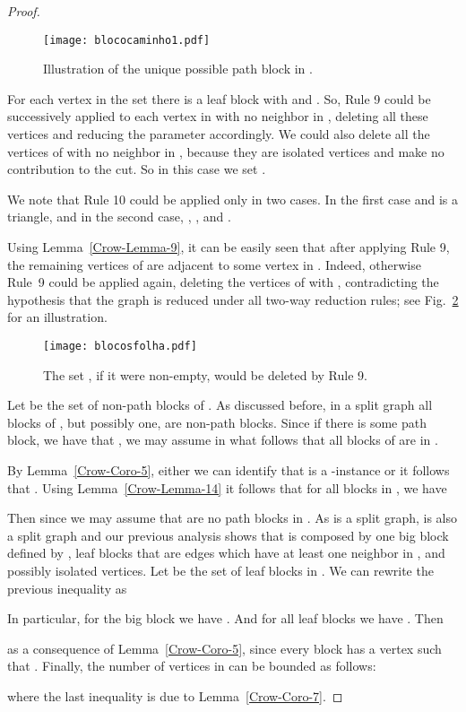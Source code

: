 \documentclass[
final
]{dmtcs-episciences}
\begin{document}
\begin{proof}
     \begin{figure}[h!]
\begin{center} \texttt{[image: blococaminho1.pdf]}
\caption{Illustration of the unique possible path block in .} \label{fig:path-block} \end{center}
\end{figure}

\newpage 

     For each vertex  in the set  there is a leaf block  with  and . So, Rule 9 could be successively applied to each vertex in  with no neighbor in , deleting all these vertices and reducing the parameter  accordingly.	We could also delete all the vertices of  with no neighbor in , because they are isolated vertices and make no contribution to the cut. So in this case we set .

     We note that Rule 10 could be applied only in two cases. In the first case  and  is a triangle, and in the second case, , , and .

	Using Lemma~\ref{Crow-Lemma-9}, it can be easily seen that after applying Rule 9, the remaining vertices of  are adjacent to some vertex in . Indeed, otherwise  Rule~9 could be applied again, deleting the vertices  of  with , contradicting the hypothesis that the graph  is reduced under all two-way reduction rules; see Fig.~\ref{fig:blocosfolha} for an illustration.


     \begin{figure}[h!]
\begin{center} \texttt{[image: blocosfolha.pdf]}
\caption{The set , if it were non-empty, would be deleted by Rule 9.} \label{fig:blocosfolha} \end{center}
\end{figure}

	Let  be the set of non-path blocks of . As discussed before,  in a split graph   all blocks of , but possibly one, are non-path blocks. Since if there is some path block, we have that , we may assume in what follows that all blocks of  are in .



By Lemma~\ref{Crow-Coro-5}, either we can identify that  is a {}-instance or it follows that . Using Lemma~\ref{Crow-Lemma-14} it follows that for all blocks  in , we have

	Then  since we may assume that are no path blocks in . As  is a split graph,  is also a split graph and our previous analysis shows that  is composed by one big block  defined by , leaf blocks that are edges which have at least one neighbor in , and possibly isolated vertices. Let  be the set of leaf blocks in . We can rewrite the previous inequality as


\newpage
In particular, for the big block  we have . And for all leaf blocks   we have .
	Then

as a consequence of Lemma~\ref{Crow-Coro-5}, since every block  has a vertex  such that .
	Finally, the number of vertices in  can be bounded as follows:

where the last inequality is due to Lemma~\ref{Crow-Coro-7}.
\end{proof}
\end{document}
